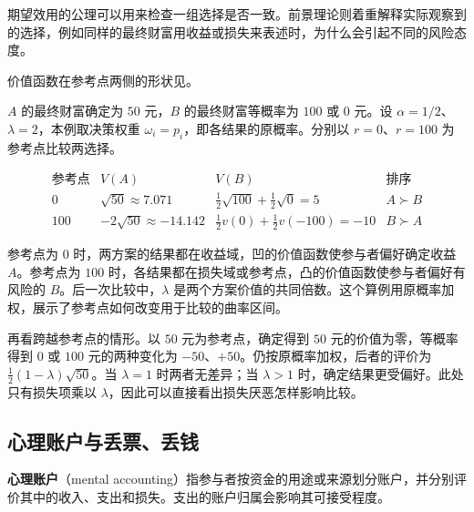 期望效用的公理可以用来检查一组选择是否一致。前景理论则着重解释实际观察到的选择，例如同样的最终财富用收益或损失来表述时，为什么会引起不同的风险态度。

价值函数在参考点两侧的形状见。


\begin{tcolorbox}[example,title=课堂例题：同样财富与不同参考点]
\begin{question}
$A$ 的最终财富确定为 $50$ 元，$B$ 的最终财富等概率为 $100$ 或 $0$ 元。设 $\alpha=1/2$、$\lambda=2$，本例取决策权重 $\omega_i=p_i$，即各结果的原概率。分别以 $r=0$、$r=100$ 为参考点比较两选择。
\end{question}
\begin{solution}[blank-type=manual,blank-vsep=4\baselineskip]
\[
\begin{array}{c|cc|c}
 \text{参考点}&V(A)&V(B)&\text{排序}\\\hline
 0&\sqrt{50}\approx7.071&\tfrac12\sqrt{100}+\tfrac12\sqrt0=5&A\succ B\\
 100&-2\sqrt{50}\approx-14.142&\tfrac12v(0)+\tfrac12v(-100)=-10&B\succ A
\end{array}
\]

参考点为 $0$ 时，两方案的结果都在收益域，凹的价值函数使参与者偏好确定收益 $A$。参考点为 $100$ 时，各结果都在损失域或参考点，凸的价值函数使参与者偏好有风险的 $B$。后一次比较中，$\lambda$ 是两个方案价值的共同倍数。这个算例用原概率加权，展示了参考点如何改变用于比较的曲率区间。
\end{solution}
\end{tcolorbox}

再看跨越参考点的情形。以 $50$ 元为参考点，确定得到 $50$ 元的价值为零，等概率得到 $0$ 或 $100$ 元的两种变化为 $-50$、$+50$。仍按原概率加权，后者的评价为 $\tfrac12(1-\lambda)\sqrt{50}$。当 $\lambda=1$ 时两者无差异；当 $\lambda>1$ 时，确定结果更受偏好。此处只有损失项乘以 $\lambda$，因此可以直接看出损失厌恶怎样影响比较。

\subsection{心理账户与丢票、丢钱}
\begin{tcolorbox}[knowledge,title=心理账户]
\textbf{心理账户}（mental accounting）指参与者按资金的用途或来源划分账户，并分别评价其中的收入、支出和损失。支出的账户归属会影响其可接受程度。
\end{tcolorbox}

